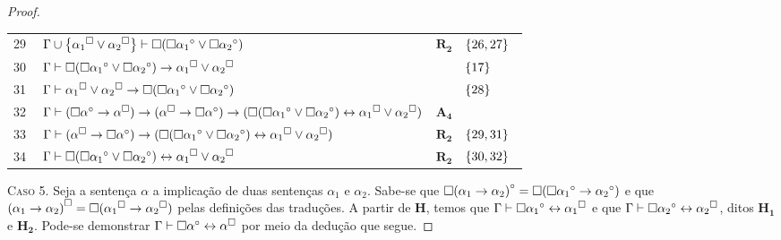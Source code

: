 \begin{tcolorbox}[enhanced jigsaw, breakable, sharp corners, colframe=black, colback=white, boxrule=0.5pt, left=1.5mm, right=1.5mm, top=1.5mm, bottom=1.5mm]
\begin{theorem}
\begin{proof}
\begin{xltabular}{\textwidth}{r | X l l}
            \scriptsize{29}\phantom{ } & $\ \Gamma \cup \left\{{\alpha_1}^\Box \vee {\alpha_2}^\Box\right\} \vdash \Box(\Box{\alpha_1}^\circ \vee \Box{\alpha_2}^\circ)$ & $\hyperref[modal.rule.2]{\mathbf{R_2}}$ & $\left\{26,27\right\}$\\[\rowskip]
            \scriptsize{30}\phantom{ } & $\ \Gamma \vdash \Box(\Box{\alpha_1}^\circ \vee \Box{\alpha_2}^\circ) \to {\alpha_1}^\Box \vee {\alpha_2}^\Box$ &  & $\left\{17\right\}$\\[\rowskip]
            \scriptsize{31}\phantom{ } & $\ \Gamma \vdash {\alpha_1}^\Box \vee {\alpha_2}^\Box \to \Box(\Box{\alpha_1}^\circ \vee \Box{\alpha_2}^\circ)$ &  & $\left\{28\right\}$\\[\rowskip]
            \scriptsize{32}\phantom{ } & $\ \Gamma \vdash (\Box\alpha^\circ \to \alpha^\Box) \to (\alpha^\Box \to \Box\alpha^\circ) \to (\Box(\Box{\alpha_1}^\circ \vee \Box{\alpha_2}^\circ) \leftrightarrow {\alpha_1}^\Box \vee {\alpha_2}^\Box)$ & $\hyperref[modal.axiom.4]{\mathbf{A_4}}$ & \\[\rowskip]
            \scriptsize{33}\phantom{ } & $\ \Gamma \vdash (\alpha^\Box \to \Box\alpha^\circ) \to (\Box(\Box{\alpha_1}^\circ \vee \Box{\alpha_2}^\circ) \leftrightarrow {\alpha_1}^\Box \vee {\alpha_2}^\Box)$ & $\hyperref[modal.rule.2]{\mathbf{R_2}}$ & $\left\{29,31\right\}$\\[\rowskip]
            \scriptsize{34}\phantom{ } & $\ \Gamma \vdash \Box(\Box{\alpha_1}^\circ \vee \Box{\alpha_2}^\circ) \leftrightarrow {\alpha_1}^\Box \vee {\alpha_2}^\Box$ & $\hyperref[modal.rule.2]{\mathbf{R_2}}$ & $\left\{30,32\right\}$\
        \end{xltabular}
        \normalsize

        \vspace{.5\baselineskip}
            \textsc{Caso 5.}
            Seja a sentença $\alpha$ a implicação de duas sentenças ${\alpha_1}$ e ${\alpha_2}$.
            Sabe-se que $\Box{({\alpha_1}\to{\alpha_2})}^\circ=\Box(\Box{\alpha_1}^\circ\to{\alpha_2}^\circ)$ e que ${({\alpha_1}\to{\alpha_2})}^\Box=\Box({\alpha_1}^\Box\to{\alpha_2}^\Box)$ pelas definições das traduções.
            A partir de $\mathbf{H}$, temos que $\Gamma\mathrel{\vdash}\Box{\alpha_1}^\circ\leftrightarrow{\alpha_1}^\Box$ e que $\Gamma\mathrel{\vdash}\Box{\alpha_2}^\circ\leftrightarrow{\alpha_2}^\Box$, ditos $\mathbf{H_1}$ e $\mathbf{H_2}$.
            Pode-se demonstrar $\Gamma\mathrel{\vdash}\Box\alpha^\circ\leftrightarrow\alpha^\Box$ por meio da dedução que segue.


\end{proof}
\end{theorem}
\end{tcolorbox}
